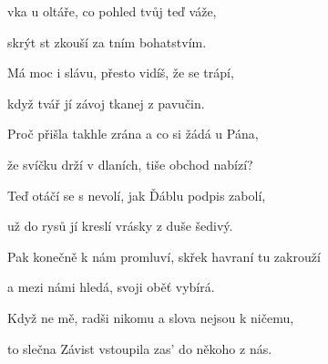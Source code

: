

\zs
{}vka u oltáře, co pohled tvůj teď váže,

skrýt st zkouší za tním bohatstvím.

Má  moc i slávu, přesto vidíš, že se trápí,

když tvář  jí závoj tkanej z  pavučin.
\ks

\zr
{}    
\kr

\zs
Proč přišla takhle zrána a co si žádá u Pána,

že svíčku drží v dlaních, tiše obchod nabízí?

\ks


\zr \kr

\zs
{}
\ks

\zr \kr

\zs
Teď otáčí se s nevolí, jak Ďáblu podpis zabolí,

už do rysů jí kreslí vrásky z duše šedivý.

Pak konečně k nám promluví, skřek havraní tu zakrouží

a mezi námi hledá, svoji oběť vybírá.

Když ne mě, radši nikomu a slova nejsou k ničemu,

to slečna Závist vstoupila zas' do někoho z nás.
\ks

\zr \kr

\kp


